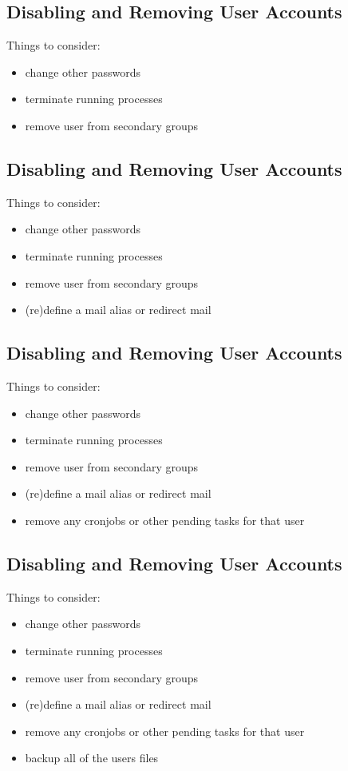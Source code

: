 \documentclass[xga]{xdvislides}
\begin{document}
\subsection{Disabling and Removing User Accounts}
Things to consider:
\begin{itemize}
	\item change other passwords
	\item terminate running processes
	\item remove user from secondary groups
\end{itemize}

\subsection{Disabling and Removing User Accounts}
Things to consider:
\begin{itemize}
	\item change other passwords
	\item terminate running processes
	\item remove user from secondary groups
	\item (re)define a mail alias or redirect mail
\end{itemize}

\subsection{Disabling and Removing User Accounts}
Things to consider:
\begin{itemize}
	\item change other passwords
	\item terminate running processes
	\item remove user from secondary groups
	\item (re)define a mail alias or redirect mail
	\item remove any cronjobs or other pending tasks for that user
\end{itemize}

\subsection{Disabling and Removing User Accounts}
Things to consider:
\begin{itemize}
	\item change other passwords
	\item terminate running processes
	\item remove user from secondary groups
	\item (re)define a mail alias or redirect mail
	\item remove any cronjobs or other pending tasks for that user
	\item backup all of the users files
\end{itemize}
\end{document}
